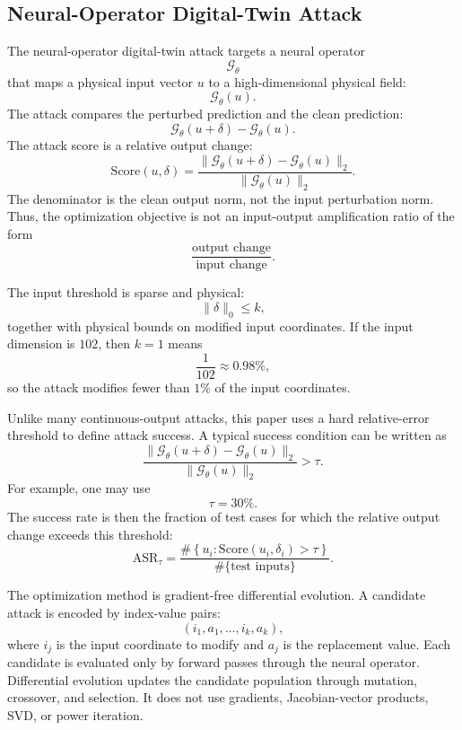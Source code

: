 \documentclass{article}
\begin{document}
\subsection{Neural-Operator Digital-Twin Attack}

The neural-operator digital-twin attack targets a neural operator
\[
    \mathcal{G}_\theta
\]
that maps a physical input vector \(u\) to a high-dimensional physical field:
\[
    \mathcal{G}_\theta(u).
\]
The attack compares the perturbed prediction and the clean prediction:
\[
    \mathcal{G}_\theta(u+\delta)
    -
    \mathcal{G}_\theta(u).
\]
The attack score is a relative output change:
\[
    \mathrm{Score}(u,\delta)
    =
    \frac{
        \|\mathcal{G}_\theta(u+\delta)-\mathcal{G}_\theta(u)\|_2
    }{
        \|\mathcal{G}_\theta(u)\|_2
    }.
\]
The denominator is the clean output norm, not the input perturbation norm. Thus, the optimization objective is not an input-output amplification ratio of the form
\[
    \frac{\text{output change}}{\text{input change}}.
\]

The input threshold is sparse and physical:
\[
    \|\delta\|_0\leq k,
\]
together with physical bounds on modified input coordinates. If the input dimension is \(102\), then \(k=1\) means
\[
    \frac{1}{102}\approx 0.98\%,
\]
so the attack modifies fewer than \(1\%\) of the input coordinates.

Unlike many continuous-output attacks, this paper uses a hard relative-error threshold to define attack success. A typical success condition can be written as
\[
    \frac{
        \|\mathcal{G}_\theta(u+\delta)-\mathcal{G}_\theta(u)\|_2
    }{
        \|\mathcal{G}_\theta(u)\|_2
    }
    >
    \tau.
\]
For example, one may use
\[
    \tau=30\%.
\]
The success rate is then the fraction of test cases for which the relative output change exceeds this threshold:
\[
    \mathrm{ASR}_{\tau}
    =
    \frac{
        \#\left\{
            u_i:
            \mathrm{Score}(u_i,\delta_i)>\tau
        \right\}
    }{
        \#\{\text{test inputs}\}
    }.
\]

The optimization method is gradient-free differential evolution. A candidate attack is encoded by index-value pairs:
\[
    (i_1,a_1,\ldots,i_k,a_k),
\]
where \(i_j\) is the input coordinate to modify and \(a_j\) is the replacement value. Each candidate is evaluated only by forward passes through the neural operator. Differential evolution updates the candidate population through mutation, crossover, and selection. It does not use gradients, Jacobian-vector products, SVD, or power iteration.
\end{document}
